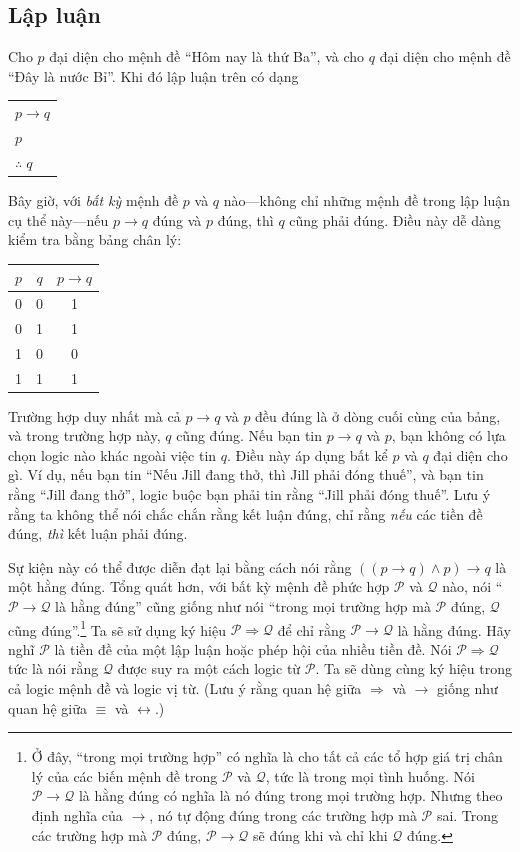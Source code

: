 \subsection{Lập luận}

Cho $p$ đại diện cho mệnh đề ``Hôm nay là thứ Ba'', và cho $q$ đại diện cho mệnh đề ``Đây là nước Bỉ''. Khi đó lập luận trên có dạng
\begin{center}
\begin{tabular}{l}
$p \to q$ \\
$p$ \\
\hline
$\therefore\; q$
\end{tabular}
\end{center}

Bây giờ, với \textit{bất kỳ} mệnh đề $p$ và $q$ nào---không chỉ những mệnh đề trong lập luận cụ thể này---nếu $p \to q$ đúng và $p$ đúng, thì $q$ cũng phải đúng. Điều này dễ dàng kiểm tra bằng bảng chân lý:
\begin{center}
\begin{tabular}{cc|c}
$p$ & $q$ & $p \to q$ \\
\hline
0 & 0 & 1 \\
0 & 1 & 1 \\
1 & 0 & 0 \\
1 & 1 & 1 \\
\end{tabular}
\end{center}
Trường hợp duy nhất mà cả $p \to q$ và $p$ đều đúng là ở dòng cuối cùng của bảng, và trong trường hợp này, $q$ cũng đúng. Nếu bạn tin $p \to q$ và $p$, bạn không có lựa chọn logic nào khác ngoài việc tin $q$. Điều này áp dụng bất kể $p$ và $q$ đại diện cho gì. Ví dụ, nếu bạn tin ``Nếu Jill đang thở, thì Jill phải đóng thuế'', và bạn tin rằng ``Jill đang thở'', logic buộc bạn phải tin rằng ``Jill phải đóng thuế''. Lưu ý rằng ta không thể nói chắc chắn rằng kết luận đúng, chỉ rằng \textit{nếu} các tiền đề đúng, \textit{thì} kết luận phải đúng.

Sự kiện này có thể được diễn đạt lại bằng cách nói rằng $((p \to q) \land p) \to q$ là một hằng đúng. Tổng quát hơn, với bất kỳ mệnh đề phức hợp $\mathcal{P}$ và $\mathcal{Q}$ nào, nói ``$\mathcal{P} \to \mathcal{Q}$ là hằng đúng'' cũng giống như nói ``trong mọi trường hợp mà $\mathcal{P}$ đúng, $\mathcal{Q}$ cũng đúng''.\footnote{Ở đây, ``trong mọi trường hợp'' có nghĩa là cho tất cả các tổ hợp giá trị chân lý của các biến mệnh đề trong $\mathcal{P}$ và $\mathcal{Q}$, tức là trong mọi tình huống. Nói $\mathcal{P} \to \mathcal{Q}$ là hằng đúng có nghĩa là nó đúng trong mọi trường hợp. Nhưng theo định nghĩa của $\to$, nó tự động đúng trong các trường hợp mà $\mathcal{P}$ sai. Trong các trường hợp mà $\mathcal{P}$ đúng, $\mathcal{P} \to \mathcal{Q}$ sẽ đúng khi và chỉ khi $\mathcal{Q}$ đúng.} Ta sẽ sử dụng ký hiệu $\mathcal{P} \Longrightarrow \mathcal{Q}$ để chỉ rằng $\mathcal{P} \to \mathcal{Q}$ là hằng đúng. Hãy nghĩ $\mathcal{P}$ là tiền đề của một lập luận hoặc phép hội của nhiều tiền đề. Nói $\mathcal{P} \Longrightarrow \mathcal{Q}$ tức là nói rằng $\mathcal{Q}$ được suy ra một cách logic từ $\mathcal{P}$. Ta sẽ dùng cùng ký hiệu trong cả logic mệnh đề và logic vị từ. (Lưu ý rằng quan hệ giữa $\Longrightarrow$ và $\to$ giống như quan hệ giữa $\equiv$ và $\leftrightarrow$.)

